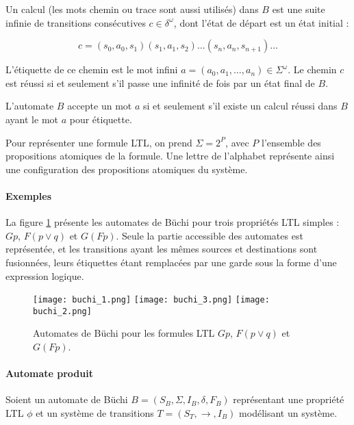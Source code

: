 Un calcul (les mots chemin ou trace sont aussi utilisés) dans \(B\) est une
suite infinie de transitions consécutives \(c \in \delta^\omega\), dont l'état
de départ est un état initial :

\[
c = (s_0, a_0, s_1)(s_1, a_1, s_2)\dots(s_n, a_n, s_{n+1})\dots
\]

L'étiquette de ce chemin est le mot infini \(a = (a_0, a_1, \dots, a_n) \in
\Sigma^\omega\). Le chemin \(c\) est réussi si et seulement s’il passe une
infinité de fois par un état final de \(B\).

L'automate \(B\) accepte un mot \(a\) si et seulement s’il existe un calcul réussi dans \(B\) ayant le mot \(a\) pour étiquette.

Pour représenter une formule \ac{LTL}, on prend \(\Sigma = 2^P\), avec \(P\)
l'ensemble des propositions atomiques de la formule. Une lettre de
l'alphabet représente ainsi une configuration des propositions atomiques
du système.

\paragraph{Exemples}

La figure \ref{fig:buchi_example} présente les automates de Büchi pour trois propriétés
\ac{LTL} simples : \(Gp\), \(F(p \lor q)\) et \(G(Fp)\). Seule la partie accessible des automates
est représentée, et les transitions ayant les mêmes sources et destinations sont fusionnées,
leurs étiquettes étant remplacées par une garde sous la forme d'une expression logique.

\begin{figure}
\begin{center}
\texttt{[image: buchi\_1.png]}
\texttt{[image: buchi\_3.png]}
\texttt{[image: buchi\_2.png]}
\end{center}
\caption{Automates de Büchi pour les formules LTL $G p$, $F(p \lor q)$ et
$G(F p)$.}
\label{fig:buchi_example}
\end{figure}

\paragraph{Automate produit}

Soient un automate de Büchi \(B = (S_B, \Sigma, I_B, \delta, F_B)\) représentant
une propriété \ac{LTL} \(\phi\) et un système de transitions \(T = (S_T, \rightarrow,
I_B)\) modélisant un système.

